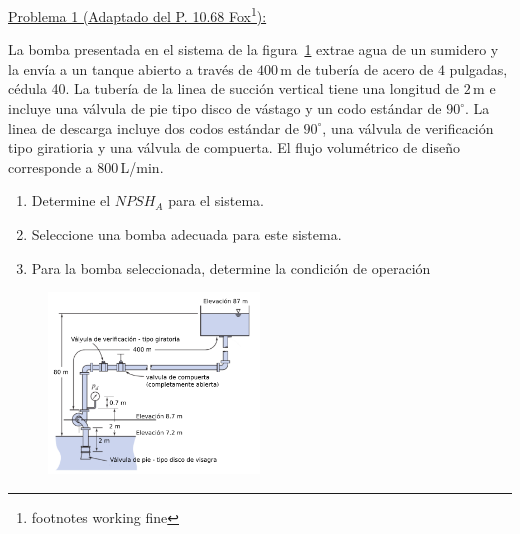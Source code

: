 \documentclass[11pt]{report}
\begin{document}

\vspace{1cm}


\vspace{1cm}

\underline {Problema 1 (Adaptado del P. 10.68 Fox\footnote{footnotes working fine}):}
\vspace{0.2cm}

La bomba presentada en el sistema de la figura~\ref{fig:fig1} extrae agua de un sumidero y la env\'ia a un tanque abierto a trav\'es de $400$\,m de tuber\'ia de acero de $4$ pulgadas, c\'edula 40. La tuber\'ia de la linea de succi\'on vertical tiene una longitud de $2$\,m e incluye una v\'alvula de pie tipo disco de v\'astago y un codo est\'andar de $90^\circ$. La linea de descarga incluye dos codos est\'andar de $90^\circ$, una v\'alvula de verificaci\'on tipo giratioria y una v\'alvula de compuerta. El flujo volum\'etrico de diseño corresponde a $800$\,L/min. 
\renewcommand{\theenumi}{\Alph{enumi}}
\begin{enumerate}
\item Determine el $NPSH_A$ para el sistema.
\item Seleccione una bomba adecuada para este sistema.
\item Para la bomba seleccionada, determine la condici\'on de operaci\'on
\end{enumerate}


\begin{figure}[H]
\centering\includegraphics[width=0.5\textwidth]{Figures/p1.png}
\caption{\label{fig:fig1} }
\end{figure}








\end{document}
